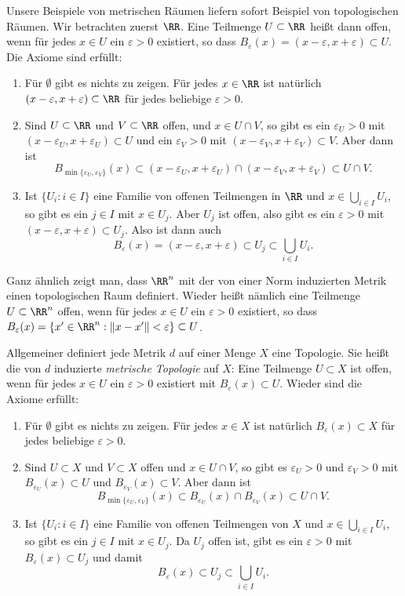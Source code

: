 Unsere Beispiele von metrischen Räumen liefern sofort Beispiel von topologischen
Räumen. Wir betrachten zuerst $\RR$. Eine Teilmenge $U\subset\RR$ heißt dann
offen, wenn für jedes $x\in U$ ein $\varepsilon > 0$ existiert, so dass
$B_\varepsilon(x) = (x-\varepsilon,x+\varepsilon)\subset U$. Die Axiome sind
erfüllt:
\begin{enumerate}
\item Für $\emptyset$ gibt es nichts zu zeigen. Für jedes $x\in \RR$ ist
natürlich $(x-\varepsilon,x+\varepsilon)\subset \RR$ für jedes beliebige
$\varepsilon>0$.
\item Sind $U\subset\RR$ und $V\subset\RR$ offen, und $x\in U\cap V$, so gibt
es ein $\varepsilon_U>0$ mit $(x-\varepsilon_U,x+\varepsilon_U)\subset U$ und ein $\varepsilon_V
> 0$ mit $(x-\varepsilon_V,x+\varepsilon_V)\subset V$. Aber dann ist
\[
B_{\min\{\varepsilon_U,\varepsilon_V\}}(x)\subset
(x-\varepsilon_U,x+\varepsilon_U)\cap (x-\varepsilon_V,x+\varepsilon_V)\subset U\cap V.
\]
\item Ist $\{U_i : i\in I\}$ eine Familie von offenen Teilmengen in $\RR$ und
$x\in \bigcup_{i\in I} U_i$, so gibt es ein $j\in I$ mit $x\in U_j$. Aber $U_j$
ist offen, also gibt es ein $\varepsilon>0$ mit
$(x-\varepsilon,x+\varepsilon)\subset U_j$. Also ist dann auch
\[
B_\varepsilon(x) = (x-\varepsilon,x+\varepsilon)\subset U_j\subset
\bigcup_{i\in I} U_i.
\]
\end{enumerate}
Ganz ähnlich zeigt man, dass $\RR^n$ mit der von einer Norm induzierten Metrik
einen topologischen Raum definiert. Wieder heißt nämlich eine Teilmenge
$U\subset\RR^n$ offen, wenn für jedes $x\in U$ ein $\varepsilon>0$ existiert,
so dass $B_\varepsilon(x) = \{x'\in\RR^n : \|x-x'\|<\varepsilon\}\subset U$.

Allgemeiner definiert jede Metrik $d$ auf einer Menge $X$ eine Topologie. Sie
heißt die von $d$ induzierte \emph{metrische Topologie} auf $X$: Eine Teilmenge
$U\subset X$ ist offen, wenn für jedes $x\in U$ ein $\varepsilon>0$ existiert
mit $B_\varepsilon(x)\subset U$. Wieder sind die Axiome erfüllt:
\begin{enumerate}
\item Für $\emptyset$ gibt es nichts zu zeigen. Für jedes $x\in X$ ist natürlich
$B_\varepsilon(x)\subset X$ für jedes beliebige $\varepsilon>0$.
\item Sind $U\subset X$ und $V\subset X$ offen und $x\in U\cap V$, so gibt es
$\varepsilon_U>0$ und $\varepsilon_V>0$ mit $B_{\varepsilon_U}(x)\subset U$ und
$B_{\varepsilon_V}(x)\subset V$. Aber dann ist
\[
B_{\min\{\varepsilon_U,\varepsilon_V\}}(x)\subset B_{\varepsilon_U}(x)\cap
B_{\varepsilon_V}(x)\subset U\cap V.
\]
\item Ist $\{U_i : i\in I\}$ eine Familie von offenen Teilmengen von $X$ und
$x\in \bigcup_{i\in I} U_i$, so gibt es ein $j\in I$ mit $x\in U_j$. Da $U_j$
offen ist, gibt es ein $\varepsilon>0$ mit $B_{\varepsilon}(x)\subset U_j$ und
damit
\[
B_\varepsilon(x)\subset U_j\subset\bigcup_{i\in I} U_i.
\]
\end{enumerate}

